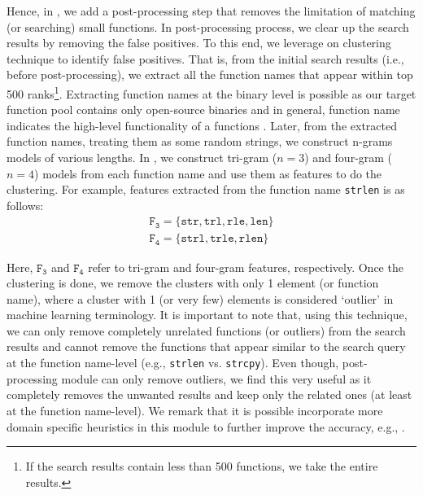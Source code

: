 Hence, in \tool, we add a post-processing step that removes the limitation of matching (or searching) small functions. In post-processing process, we clear up the search results by removing the false positives. To this end, we leverage on clustering technique to identify false positives. That is, from the initial search results (i.e., before post-processing), we extract all the function names that appear within top 500 ranks\footnote{If the search results contain less than 500 functions, we take the entire results.}. Extracting function names at the binary level is possible as our target function pool contains only open-source binaries and in general, function name indicates the high-level functionality of a functions . Later, from the extracted function names, treating them as some random strings, we construct n-grams models of various lengths. In \tool, we construct tri-gram ($n=3$) and four-gram ($n=4$) models from each function name and use them as features to do the clustering. For example, features extracted from the function name \texttt{strlen} is as follows:
\begin{eqnarray}
\mathtt{F_3 = \lbrace str,trl,rle,len\rbrace}  \\
\mathtt{F_4 = \lbrace strl,trle,rlen\rbrace}
\end{eqnarray}

Here, $\mathtt{F_3}$ and $\mathtt{F_4}$ refer to tri-gram and four-gram features, respectively. Once the clustering is done, we remove the clusters with only 1 element (or function name), where a cluster with 1 (or very few) elements is considered `outlier' in machine learning terminology. It is important to note that, using this technique, we can only remove completely unrelated functions (or outliers) from the search results and cannot remove the functions that appear similar to the search query at the function name-level (e.g., \texttt{strlen} vs. \texttt{strcpy}). Even though, post-processing module can only remove outliers, we find this very useful as it completely removes the unwanted results and keep only the related ones (at least at the function name-level). We remark that it is possible incorporate more domain specific heuristics in this module to further improve the accuracy, e.g., .
